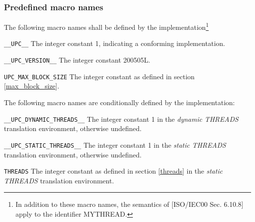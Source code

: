 \subsubsection{Predefined macro names}

\npf The following macro names shall be defined by the
    implementation\footnote{In addition to these macro names,
    the semantics of [ISO/IEC00 Sec. 6.10.8] apply to the identifier MYTHREAD.}

\begin{description}
\item{\tt \_\_UPC\_\_} 
The integer constant 1, indicating a conforming implementation.

\item{\tt \_\_UPC\_VERSION\_\_}
The integer constant 200505L.

\item{\tt UPC\_MAX\_BLOCK\_SIZE}
The integer constant as defined in section \ref{max_block_size}.
\end{description}

\np The following macro names are conditionally defined 
    by the implementation:

\begin{description}
\item{\tt \_\_UPC\_DYNAMIC\_THREADS\_\_} 
The integer constant 1 in the {\em dynamic THREADS} translation environment,
otherwise undefined.

\item{\tt \_\_UPC\_STATIC\_THREADS\_\_} 
The integer constant 1 in the {\em static THREADS} translation environment,
otherwise undefined.

\item{\tt THREADS}
The integer constant as defined in section \ref{threads} in the
{\em static THREADS} translation environment.

\end{description}

